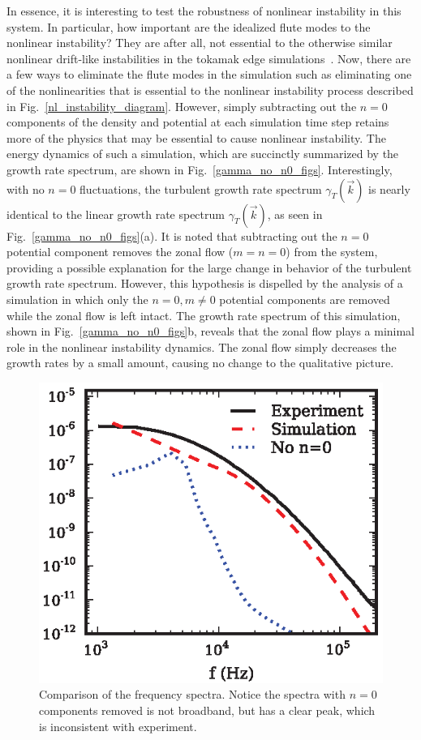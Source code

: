\documentclass[showpacs,preprintnumbers,amsmath,amssymb,superscriptaddress]{revtex4}
\begin{document}
In essence, it is interesting to test the robustness of nonlinear instability in this system. In particular, how important are the idealized flute modes to the nonlinear instability?
They are after all, not essential to the otherwise similar nonlinear drift-like instabilities in the tokamak edge simulations~\cite{zeiler1996,zeiler1997,scott2002,scott2003,scott2005}.
Now, there are a few ways to eliminate the flute modes in the simulation such as
eliminating one of the nonlinearities that is essential to the nonlinear instability process described in Fig.~\ref{nl_instability_diagram}. However, simply subtracting out the $n=0$
components of the density and potential at each simulation time step retains more of the physics that may be essential to cause nonlinear instability. The energy dynamics of such a simulation,
which are succinctly summarized by the growth rate spectrum,
are shown in Fig.~\ref{gamma_no_n0_figs}. Interestingly, with no $n=0$
fluctuations, the turbulent growth rate spectrum $\gamma_T(\vec{k})$ is nearly identical to the linear growth rate spectrum $\gamma_T(\vec{k})$, as seen in
Fig.~\ref{gamma_no_n0_figs}(a). It is noted that subtracting out the $n=0$ potential component removes the zonal flow ($m=n=0$) from the system, providing a possible explanation for the large change
in behavior of the turbulent growth rate spectrum. However, this hypothesis is dispelled by the analysis of a simulation in which only the $n=0, m \ne 0$ potential components are removed while 
the zonal flow is left intact. The growth rate spectrum of this simulation, shown in Fig.~\ref{gamma_no_n0_figs}b, reveals that the zonal flow plays a minimal role in the nonlinear instability
dynamics. The zonal flow simply decreases the growth rates by a small amount, causing no change to the qualitative picture. 

\begin{figure}[!htbp]
\includegraphics[]{spectra_3}
\hfil
\caption{Comparison of the frequency spectra. Notice the spectra with $n=0$ components removed is not broadband, but has a clear peak, which is inconsistent with experiment.}
\label{freq_spectra3}
\end{figure}
\end{document}
